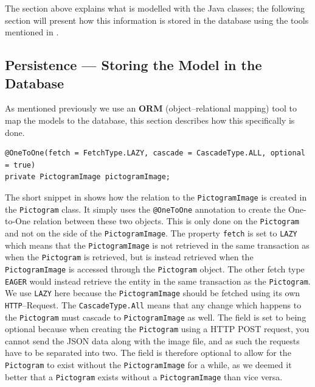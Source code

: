\bigskip \noindent
The section above explains what is modelled with the Java classes; the following section will present how this information is stored in the database using the tools mentioned in .

\subsection{Persistence --- Storing the Model in the Database}\label{subsec:pictomodelstore}

As mentioned previously we use an \textbf{ORM} (object--relational mapping) tool to map the models to the database, this section describes how this specifically is done.

\begin{lstlisting}[caption={Fields with annotations which causes Hibernate to perform the ORM for a \texttt{PictogramImage}.},label={lst:PictoImage}]
@OneToOne(fetch = FetchType.LAZY, cascade = CascadeType.ALL, optional = true)
private PictogramImage pictogramImage;
\end{lstlisting}

The short snippet in  shows how the relation to the \texttt{PictogramImage} is created in the \texttt{Pictogram} class.
It simply uses the \texttt{@OneToOne} annotation to create the One-to-One relation between these two objects.
This is only done on the \texttt{Pictogram} and not on the side of the \texttt{PictogramImage}.
The property \texttt{fetch} is set to \texttt{LAZY} which means that the \texttt{PictogramImage} is not retrieved in the same transaction as when the \texttt{Pictogram} is retrieved, but is instead retrieved when the \texttt{PictogramImage} is accessed through the \texttt{Pictogram} object.
The other fetch type \texttt{EAGER} would instead retrieve the entity in the same transaction as the \texttt{Pictogram}.
We use \texttt{LAZY} here because the \texttt{PictogramImage} should be fetched using its own \texttt{HTTP}--Request.
The \texttt{CascadeType.All} means that any change which happens to the \texttt{Pictogram} must cascade to \texttt{PictogramImage} as well.
The field is set to being optional because when creating the \texttt{Pictogram} using a HTTP POST request, you cannot send the JSON data along with the image file, and as such the requests have to be separated into two.
The field is therefore optional to allow for the \texttt{Pictogram} to exist without the \texttt{PictogramImage} for a while, as we deemed it better that a \texttt{Pictogram} exists without a \texttt{PictogramImage} than vice versa.


